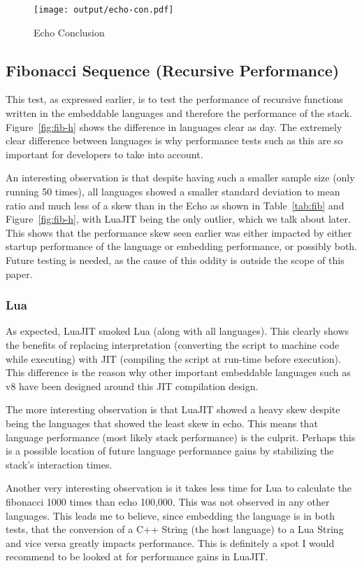 \begin{figure}[H]
	\centering
		\texttt{[image: output/echo-con.pdf]}
	\caption{Echo Conclusion}
	\label{fig:echo-con}
\end{figure}

\subsection{Fibonacci Sequence (Recursive Performance)} \label{sec:analysis:fib}
This test, as expressed earlier, is to test the performance of recursive functions written in the embeddable languages and therefore the performance of the stack. Figure~\ref{fig:fib-h} shows the difference in languages clear as day. The extremely clear difference between languages is why performance tests such as this are so important for developers to take into account.

An interesting observation is that despite having such a smaller sample size (only running 50 times), all languages showed a smaller standard deviation to mean ratio and much less of a skew than in the Echo as shown in Table~\ref{tab:fib} and Figure~\ref{fig:fib-h}, with LuaJIT being the only outlier, which we talk about later. This shows that the performance skew seen earlier was either impacted by either startup performance of the language or embedding performance, or possibly both. Future testing is needed, as the cause of this oddity is outside the scope of this paper.

\subsubsection{Lua}
As expected, LuaJIT smoked Lua (along with all languages). This clearly shows the benefits of replacing interpretation (converting the script to machine code while executing) with JIT (compiling the script at run-time before execution). This difference is the reason why other important embeddable languages such as v8\cite{v8} have been designed around this JIT compilation design.

The more interesting observation is that LuaJIT showed a heavy skew despite being the languages that showed the least skew in echo. This means that language performance (most likely stack performance) is the culprit. Perhaps this is a possible location of future language performance gains by stabilizing the stack's interaction times.

Another very interesting observation is it takes less time for Lua to calculate the fibonacci 1000 times than echo 100,000. This was not observed in any other languages. This leads me to believe, since embedding the language is in both tests, that the conversion of a C++ String (the host language) to a Lua String and vice versa greatly impacts performance. This is definitely a spot I would recommend to be looked at for performance gains in LuaJIT.

